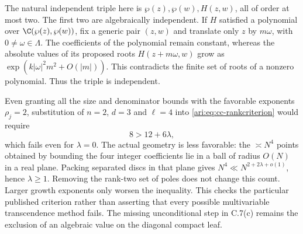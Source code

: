 The natural independent triple here is
$\wp(z),\wp(w),H(z,w)$, all of order at most two.
The first two are algebraically independent. If $H$ satisfied
a polynomial over $\C(\wp(z),\wp(w))$, fix a generic pair
$(z,w)$ and translate only $z$ by $m\omega$, with
$0\ne\omega\in\Lambda$. The coefficients of the polynomial
remain constant, whereas the absolute values of its proposed
roots $H(z+m\omega,w)$ grow as
$\exp(k|\omega|^2m^2+O(|m|))$. This contradicts the finite
set of roots of a nonzero polynomial. Thus the triple is
independent.

Even granting all the size and denominator bounds with the
favorable exponents $\rho_j=2$, substitution of
$n=2$, $d=3$ and $\ell=4$ into
\eqref{ari:eq:cc-rankcriterion} would require
\[
 8>12+6\lambda,
\]
which fails even for $\lambda=0$. The actual geometry is
less favorable: the $\asymp N^4$ points obtained by bounding
the four integer coefficients lie in a ball of radius $O(N)$
in a real plane. Packing separated discs in that plane gives
$N^4\ll N^{2+2\lambda+o(1)}$, hence $\lambda\ge1$.
Removing the rank-two set of poles does not change this count.
Larger growth exponents only worsen the inequality. This
checks the particular published criterion rather than asserting
that every possible multivariable transcendence method fails.
The missing unconditional step in C.7(c) remains the exclusion
of an algebraic value on the diagonal compact leaf.
